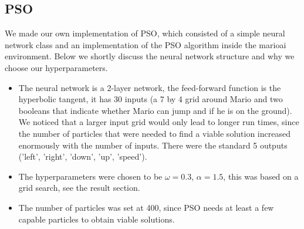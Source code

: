 \documentclass[]{article}
\begin{document}
\subsection{PSO}
We made our own implementation of PSO, which consisted of a simple neural network class and an implementation of the PSO algorithm inside the marioai environment. Below we shortly discuss the neural network structure and why we choose our hyperparameters.
\begin{itemize}
    \item The neural network is a 2-layer network, the feed-forward function is the hyperbolic tangent, it has 30 inputs (a 7 by 4 grid around Mario and two booleans that indicate whether Mario can jump and if he is on the ground). We noticed that a larger input grid would only lead to longer run times, since the number of particles that were needed to find a viable solution increased enormously with the number of inputs. There were the standard 5 outputs ('left', 'right', 'down', 'up', 'speed').
    \item The hyperparameters were chosen to be $\omega = 0.3$, $\alpha = 1.5$, this was based on a grid search, see the result section.
    \item The number of particles was set at 400, since PSO needs at least a few capable particles to obtain viable solutions.
\end{itemize}
\end{document}
